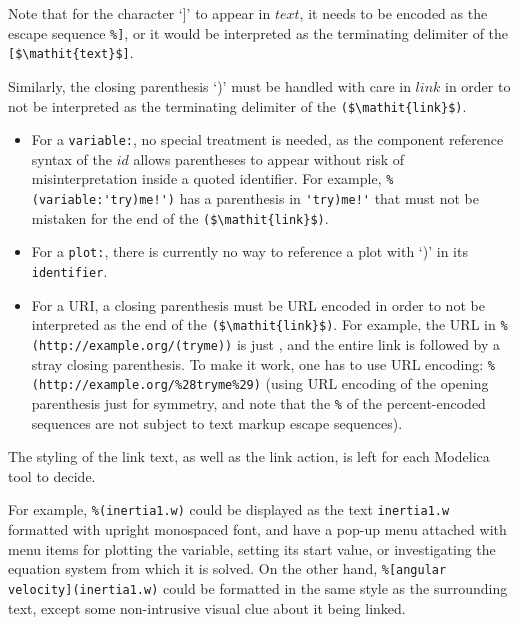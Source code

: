 \begin{nonnormative}
Note that for the character `]' to appear in $\mathit{text}$, it needs to be encoded as the escape sequence \lstinline!%]!, or it would be interpreted as the terminating delimiter of the \lstinline![$\mathit{text}$]!.

Similarly, the closing parenthesis `)' must be handled with care in $\mathit{link}$ in order to not be interpreted as the terminating delimiter of the \lstinline!($\mathit{link}$)!.
\begin{itemize}
\item
For a \lstinline!variable:!, no special treatment is needed, as the component reference syntax of the $\mathit{id}$ allows parentheses to appear without risk of misinterpretation inside a quoted identifier.
For example, \lstinline"%(variable:'try)me!')" has a parenthesis in \lstinline"'try)me!'" that must not be mistaken for the end of the \lstinline!($\mathit{link}$)!.
\item
For a \lstinline!plot:!, there is currently no way to reference a plot with `)' in its \lstinline!identifier!.
\item
For a URI, a closing parenthesis must be URL encoded in order to not be interpreted as the end of the \lstinline!($\mathit{link}$)!.
For example, the URL in \lstinline[language={[nocomment]modelica}]!%
To make it work, one has to use URL encoding: \lstinline[language={[nocomment]modelica}]!%
\end{itemize}
\end{nonnormative}

The styling of the link text, as well as the link action, is left for each Modelica
tool to decide.

\begin{nonnormative}
For example, \lstinline!%(inertia1.w)! could be displayed as the text
\lstinline!inertia1.w! formatted with upright monospaced font, and have a pop-up
menu attached with menu items for plotting the variable, setting its start
value, or investigating the equation system from which it is solved.  On the
other hand, \lstinline!%[angular velocity](inertia1.w)! could be formatted in
the same style as the surrounding text, except some non-intrusive visual clue
about it being linked.
\end{nonnormative}

